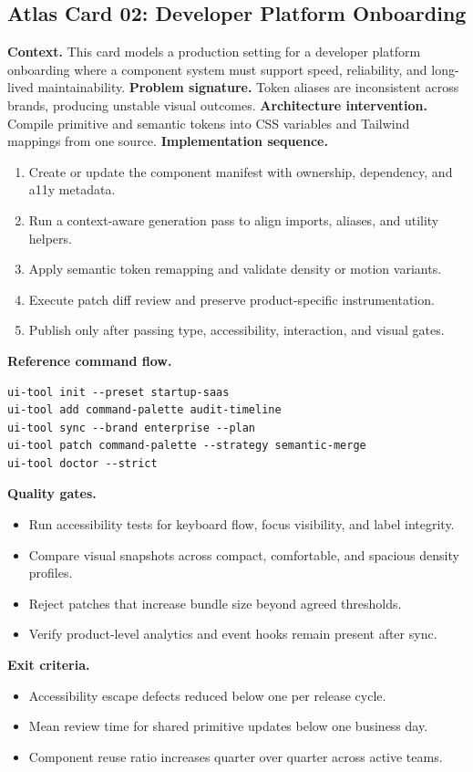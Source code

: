 \subsection*{Atlas Card 02: Developer Platform Onboarding}
\textbf{Context.} This card models a production setting for a developer platform onboarding where a component system must support speed, reliability, and long-lived maintainability.
\textbf{Problem signature.} Token aliases are inconsistent across brands, producing unstable visual outcomes.
\textbf{Architecture intervention.} Compile primitive and semantic tokens into CSS variables and Tailwind mappings from one source.
\textbf{Implementation sequence.}
\begin{enumerate}[leftmargin=*, itemsep=0.28em]
  \item Create or update the component manifest with ownership, dependency, and a11y metadata.
  \item Run a context-aware generation pass to align imports, aliases, and utility helpers.
  \item Apply semantic token remapping and validate density or motion variants.
  \item Execute patch diff review and preserve product-specific instrumentation.
  \item Publish only after passing type, accessibility, interaction, and visual gates.
\end{enumerate}
\textbf{Reference command flow.}
\begin{verbatim}
ui-tool init --preset startup-saas
ui-tool add command-palette audit-timeline
ui-tool sync --brand enterprise --plan
ui-tool patch command-palette --strategy semantic-merge
ui-tool doctor --strict
\end{verbatim}
\textbf{Quality gates.}
\begin{itemize}[leftmargin=*, itemsep=0.24em]
  \item Run accessibility tests for keyboard flow, focus visibility, and label integrity.
  \item Compare visual snapshots across compact, comfortable, and spacious density profiles.
  \item Reject patches that increase bundle size beyond agreed thresholds.
  \item Verify product-level analytics and event hooks remain present after sync.
\end{itemize}
\textbf{Exit criteria.}
\begin{itemize}[leftmargin=*, itemsep=0.24em]
  \item Accessibility escape defects reduced below one per release cycle.
  \item Mean review time for shared primitive updates below one business day.
  \item Component reuse ratio increases quarter over quarter across active teams.
\end{itemize}
\clearpage
